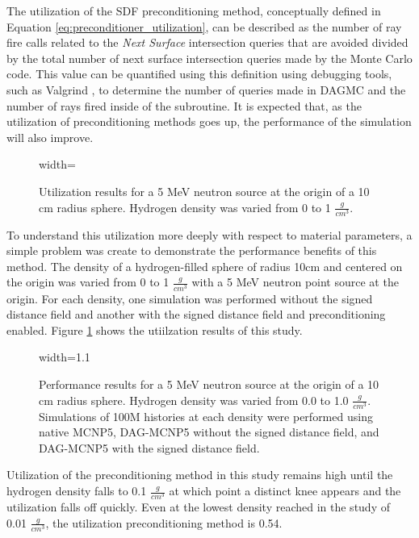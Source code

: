 The utilization of the SDF preconditioning method, conceptually defined in
Equation \ref{eq:preconditioner_utilization}, can be described as the number of
ray fire calls related to the \textit{Next Surface} intersection queries that
are avoided divided by the total number of next surface intersection queries
made by the Monte Carlo code. This value can be quantified using this definition
using debugging tools, such as Valgrind \cite{Pena_2016}, to determine the
number of queries made in DAGMC and the number of rays fired inside of the
subroutine.  It is expected that, as the utilization of preconditioning methods
goes up, the performance of the simulation will also improve.

\begin{figure}[ht]
  \centering
  {width=\textwidth}
  \caption{Utilization results for a 5 MeV neutron source at the origin of a 10 cm radius
    sphere. Hydrogen density was varied from 0 to 1 $\frac{g}{cm^3}$.}
  \label{fig:sphere_hydrogen_density_study_util}
\end{figure}

To understand this utilization more deeply with respect to material parameters,
a simple problem was create to demonstrate the performance benefits of this
method. The density of a hydrogen-filled sphere of radius 10cm and centered on
the origin was varied from 0 to 1 $\frac{g}{cm^3}$ with a 5 MeV neutron point
source at the origin. For each density, one simulation was performed without the
signed distance field and another with the signed distance field and
preconditioning enabled. Figure \ref{fig:sphere_hydrogen_density_study_util}
shows the utiilzation results of this study.

\begin{figure}[ht]
  \centering
  {width=1.1\textwidth}
  \caption{Performance results for a 5 MeV neutron source at the origin of a 10
    cm radius sphere. Hydrogen density was varied from 0.0 to 1.0
    $\frac{g}{cm^3}$. Simulations of 100M histories at each density were
    performed using native MCNP5, DAG-MCNP5 without the signed distance field,
    and DAG-MCNP5 with the signed distance field.}
  \label{fig:sphere_hydrogen_density_study_perf}
\end{figure}

Utilization of the preconditioning method in this study remains high until the
hydrogen density falls to 0.1 $\frac{g}{cm^3}$ at which point a distinct knee
appears and the utilization falls off quickly. Even at the lowest density
reached in the study of 0.01 $\frac{g}{cm^3}$, the utilization preconditioning
method is 0.54.


